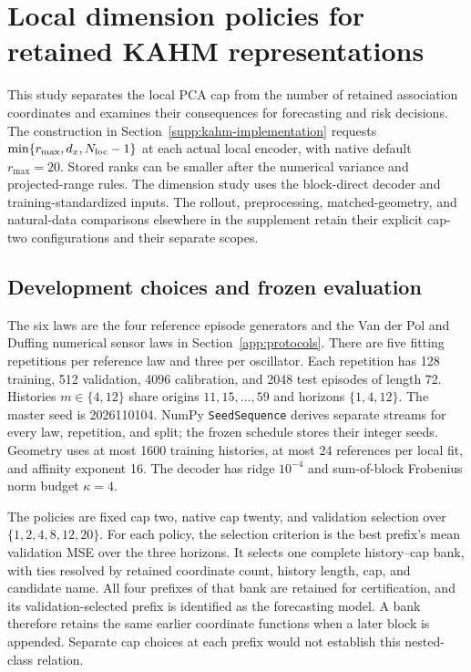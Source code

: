 \section{Local dimension policies for retained KAHM representations}
\label{supp:dimension-policy}

This study separates the local PCA cap from the number of retained association
coordinates and examines their consequences for forecasting and risk decisions.
The construction in Section~\ref{supp:kahm-implementation} requests
$\min\{r_{\max},d_x,N_{\rm loc}-1\}$ at each actual local encoder, with native
default $r_{\max}=20$. Stored ranks can be smaller after the numerical
variance and projected-range rules. The dimension study uses the block-direct
decoder and training-standardized inputs. The rollout, preprocessing,
matched-geometry, and natural-data comparisons elsewhere in the supplement
retain their explicit cap-two configurations and their separate scopes.

\subsection{Development choices and frozen evaluation}

The six laws are the four reference episode generators and the Van der Pol
and Duffing numerical sensor laws in Section~\ref{app:protocols}. There are
five fitting repetitions per reference law and three per oscillator. Each
repetition has 128 training, 512 validation, 4096 calibration, and 2048 test
episodes of length 72. Histories $m\in\{4,12\}$ share origins
$11,15,\ldots,59$ and horizons $\{1,4,12\}$. The master seed is
2026110104. NumPy \texttt{SeedSequence} derives separate streams for every law,
repetition, and split; the frozen schedule stores their integer seeds.
Geometry uses at most 1600 training histories, at most 24 references per
local fit, and affinity exponent 16. The decoder has ridge $10^{-4}$ and
sum-of-block Frobenius norm budget $\kappa=4$.

The policies are fixed cap two, native cap twenty, and validation selection
over $\{1,2,4,8,12,20\}$. For each policy, the selection criterion is the best
prefix's mean validation MSE over the three horizons. It selects one complete
history--cap bank, with ties resolved by retained coordinate count, history
length, cap, and candidate name. All four prefixes of that bank are retained
for certification, and its validation-selected prefix is identified as the
forecasting model. A bank therefore retains the same earlier coordinate
functions when a later block is appended. Separate cap choices at each prefix
would not establish this nested-class relation.

